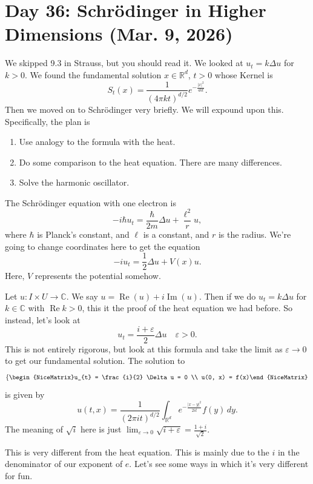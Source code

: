 \section{Day 36: Schr\"odinger in Higher Dimensions (Mar. 9, 2026)}
We skipped 9.3 in Strauss, but you should read it. We looked at \( u_{t} = k \Delta u \) for \( k > 0 \). We found the fundamental solution \( x \in \mathbb{R}^{d}\), \(t > 0 \) whose Kernel is
\[ S_{t}(x) = \frac{1}{\left( 4 \pi k t \right)^{d/2}} e^{- \frac{|x|^{2}}{4 k t}}. \]
Then we moved on to Schr\"odinger very briefly. We will expound upon this. Specifically, the plan is
\begin{enumerate}

	\item Use analogy to the formula with the heat.
	\item Do some comparison to the heat equation. There are many differences.
	\item Solve the harmonic oscillator.

\end{enumerate}
The Schr\"odinger equation with one electron is
\[ - i \hbar u_{t} = \frac{\hbar}{2 m} \Delta u + \frac{\ell^{2}}{r} u, \]
where \( \hbar \) is Planck's constant, and \( \ell \) is a constant, and \( r \) is the radius. We're going to change coordinates here to get the equation
\[ -i u_{t} = \frac{1}{2} \Delta u + V(x) u. \]
Here, \( V \) represents the potential somehow.

Let \( u \colon I \times U \to \mathbb{C} \). We say \( u = \operatorname{Re}(u) + i \operatorname{Im}(u) \). Then if we do \( u_{t} = k \Delta u \) for \( k \in \mathbb{C} \) with \( \operatorname{Re} k > 0 \), this it the proof of the heat equation we had before. So instead, let's look at
\[ u_{t} = \frac{i + \varepsilon}{2} \Delta u \quad \varepsilon > 0. \]
This is not entirely rigorous, but look at this formula and take the limit as \( \varepsilon \to 0 \) to get our fundamental solution. The solution to
\[ \left\{\begin{NiceMatrix}u_{t} = \frac{i}{2} \Delta u = 0 \\ u(0, x) = f(x)\end{NiceMatrix}\right.  \]
is given by
\[ u(t, x) = \frac{1}{\left( 2 \pi i t \right)^{d/2}} \int_{\mathbb{R}^{d}} e^{- \frac{|x-y|^{2}}{2it}} f(y) \, dy. \]
The meaning of \( \sqrt{i} \) here is just \( \lim_{\varepsilon \to 0} \sqrt{i + \varepsilon} = \frac{1+i}{\sqrt{2}} \). 
\begin{remark}
	This is very different from the heat equation. This is mainly due to the \( i \) in the denominator of our exponent of \( e \). Let's see some ways in which it's very different for fun.
\end{remark}

